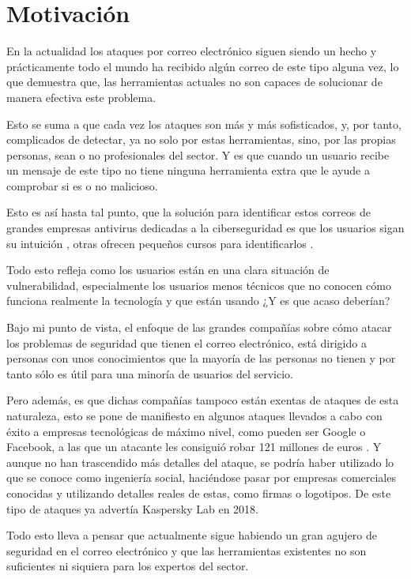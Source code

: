 \chapter{Motivación}
En la actualidad los ataques por correo electrónico siguen siendo un hecho y prácticamente todo el mundo ha recibido algún correo de este tipo alguna vez, lo que demuestra que, las herramientas actuales no son capaces de solucionar de manera efectiva este problema. 

Esto se suma a que cada vez los ataques son más y más sofisticados, y, por tanto, complicados de detectar, ya no solo por estas herramientas, sino, por las propias personas, sean o no profesionales del sector. Y es que cuando un usuario recibe un mensaje de este tipo no tiene ninguna herramienta extra que le ayude a comprobar si es o no malicioso. 

Esto es así hasta tal punto, que la solución para identificar estos correos de grandes empresas antivirus dedicadas a la ciberseguridad es que los usuarios sigan su intuición \cite{What_is_phishing}, otras ofrecen pequeños cursos para identificarlos \cite{Google_juego}.

Todo esto refleja como los usuarios están en una clara situación de vulnerabilidad, especialmente los usuarios menos técnicos que no conocen cómo funciona realmente la tecnología y que están usando ¿Y es que acaso deberían?

Bajo mi punto de vista, el enfoque de las grandes compañías sobre cómo atacar los problemas de seguridad que tienen el correo electrónico, está dirigido a personas con unos conocimientos que la mayoría de las personas no tienen y por tanto sólo es útil para una minoría de usuarios del servicio. 

Pero además, es que dichas compañías tampoco están exentas de ataques de esta naturaleza, esto se pone de manifiesto en algunos ataques llevados a cabo con éxito a empresas tecnológicas de máximo nivel, como pueden ser Google o Facebook, a las que un atacante les consiguió robar 121 millones de euros \cite{estafa_google_facebook}. Y aunque no han trascendido más detalles del ataque, se podría haber utilizado lo que se conoce como ingeniería social, haciéndose pasar por empresas comerciales conocidas y utilizando detalles reales de estas, como firmas o logotipos. De este tipo de ataques ya advertía Kaspersky Lab en 2018. \cite{cifrasPhising}

Todo esto lleva a pensar que actualmente sigue habiendo un gran agujero de seguridad en el correo electrónico y que las herramientas existentes no son suficientes ni siquiera para los expertos del sector. 

